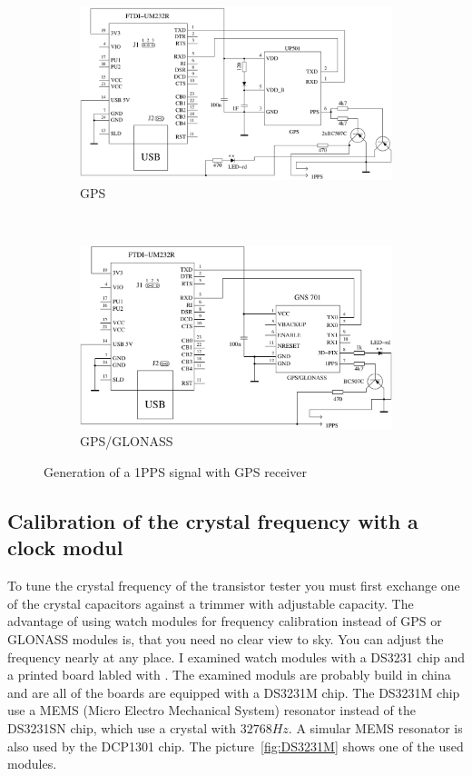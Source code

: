\begin{figure}[H]
  \begin{subfigure}[b]{.5\textwidth}
    \centering
    \includegraphics[width=.95\textwidth]{../FIG/GPS_UP501.pdf}
    \caption{GPS}
  \end{subfigure}
  ~
  \begin{subfigure}[b]{.5\textwidth}
    \centering
    \includegraphics[width=.95\textwidth]{../FIG/GPS_GNS701.pdf}
    \caption{GPS/GLONASS}
  \end{subfigure}
  \caption{Generation of a 1PPS signal with GPS receiver }
  \label{fig:GPS-1PPS}
\end{figure}

\subsection{Calibration of the crystal frequency with a clock modul}

To tune the crystal frequency of the transistor tester you must first exchange one of the
crystal capacitors against a trimmer with adjustable capacity.
The advantage of using watch modules for frequency calibration instead of GPS or GLONASS modules is,
that you need no clear view to sky. You can adjust the frequency nearly at any place.
I examined watch modules with a DS3231 chip and a printed board labled with .
The examined moduls are probably build in china and are all of the boards are equipped
with a DS3231M chip. The DS3231M chip use a MEMS (Micro Electro Mechanical System) resonator 
instead of the DS3231SN chip, which use a crystal with \(32768Hz\).
A simular MEMS resonator is also used by the DCP1301 chip.
The picture~\ref{fig:DS3231M} shows one of the used modules.


